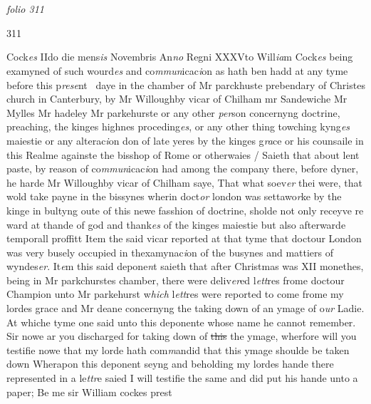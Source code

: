 \documentclass[12pt, a4paper]{book}
\begin{document}
\dotfill
					  \section*{}  \subsection*{}

\textit{folio 311}



\begin{flushright}{\color{Mahogany}311}\end{flushright} Cock\textit{es} IIdo die mens\textit{is} Novembris An\textit{no} Regni XXXVto  Will\textit{ia}m Cock\textit{es }being examyned of such wourd\textit{es} and co\textit{mmun}icac\textit{i}on as hath ben hadd at any tyme before this p\textit{rese}nt  daye in the chamber of Mr parckhuste prebendary  of Christes church in Canterbury, by Mr Willoughby vicar of Chilham mr Sandewiche Mr Mylles Mr hadeley Mr parkehurste or any other \textit{per}son  concernyng doctrine, preaching, the kinges highnes proceding\textit{es}, or any other thing towching 
			kyng\textit{es} maiestie  or any alterac\textit{i}on don of late yeres by the kinges g\textit{ra}ce or his counsaile in this Realme againste the bisshop of Rome or otherwaies / Saieth that about  lent paste, by reason of co\textit{mmun}icac\textit{i}on had among the company 
				\marginpar[\vspace{0.5cm}{\textcolor{Gray}{D. willoughby}}]{}
			 there, before dyner, he harde Mr Willoughby vicar 
				\marginpar[\vspace{0.5cm}{\textcolor{Gray}{n}}]{}
			 of Chilham saye, That what soev\textit{er} thei were, that wold take payne in the bissynes wherin doct\textit{or} london was settawo\textit{r}ke by the kinge in bultyng oute of this newe fasshion of doctrine, sholde not only receyve re
			ward at thande of god and thank\textit{es} of the kinges maiestie but also afterwarde temporall proffitt Item the said vicar reported at that tyme that doctour London was very busely occupied in thexamynac\textit{i}on of  the busynes and mattiers of wyndes\textit{er}.  It\textit{e}m this said depone\textit{n}t saieth that after Christmas was XII monethes, being in Mr parkchurstes chamber, there were deliv\textit{er}ed l\textit{ett}res frome doctour Champion unto Mr parkehurst w\textit{hich} l\textit{ett}res were reported to come frome my lordes grace and Mr deane concernyng the taking down of  an ymage of o\textit{ur} Ladie. At whiche tyme one said unto this deponente whose name he cannot remember. Sir  nowe ar you discharged for taking down of \sout{this }the  ymage, wherfore will you testifie nowe that my lorde hath com\textit{m}andid that this ymage shoulde be taken down Wherapon this deponent seyng and beholding my lordes hande there represented in a le\textit{ttr}e saied I will testifie the same and did put his hande unto a paper;   Be me sir William cockes prest 
\end{document}

